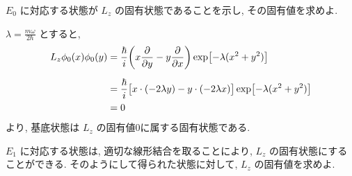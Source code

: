 \documentclass[../../ou-physics-exam.tex]{subfiles}
\begin{document}
$ E_0 $ に対応する状態が $ L_z $ の固有状態であることを示し, その固有値を求めよ.
\begin{answer}
    $ \displaystyle \lambda = \frac{m \omega}{2 \hbar} $ とすると,
    \begin{align*}
        L_z \phi_0 (x) \phi_0 (y) 
        & = \frac{\hbar}{i} \qty(x \pdv{y} - y \pdv{x}) \exp [- \lambda (x^2 + y^2)] \\[2mm]
        & = \frac{\hbar}{i} \big[x \cdot (-2 \lambda y) - y \cdot (-2 \lambda x) \big] \exp [- \lambda (x^2 + y^2)] \\
        & = 0
    \end{align*}
    より, 基底状態は $ L_z $ の固有値0に属する固有状態である.
\end{answer}

$ E_1 $ に対応する状態は, 適切な線形結合を取ることにより, $ L_z $ の固有状態にすることができる. 
そのようにして得られた状態に対して, $ L_z $ の固有値を求めよ.
\end{document}

